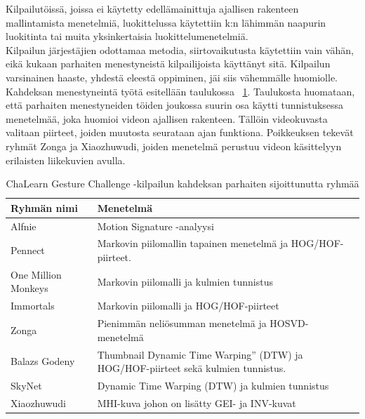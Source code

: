 Kilpailutöissä, joissa ei käytetty edellämainittuja ajallisen rakenteen mallintamista menetelmiä, 
luokittelussa käytettiin k:n lähimmän naapurin luokitinta tai muita yksinkertaisia luokittelumenetelmiä. \\

Kilpailun järjestäjien odottamaa metodia, siirtovaikutusta käytettiin vain vähän, eikä kukaan parhaiten menestyneistä kilpailijoista käyttänyt sitä.
Kilpailun varsinainen haaste, yhdestä eleestä oppiminen, jäi siis vähemmälle huomiolle. \citep {6239178} \\

Kahdeksan menestyneintä työtä esitellään taulukossa ~\ref{table:dvbt_param}. Taulukosta huomataan, että parhaiten menestyneiden töiden
joukossa suurin osa käytti tunnistuksessa menetelmää, joka huomioi videon ajallisen rakenteen. Tällöin videokuvasta valitaan piirteet, joiden
muutosta seurataan ajan funktiona. Poikkeuksen tekevät ryhmät Zonga ja Xiaozhuwudi, joiden menetelmä perustuu videon käsittelyyn erilaisten liikekuvien avulla. 
\citep {6239178}\\

\begin{table}[th]
\caption{ChaLearn Gesture Challenge -kilpailun kahdeksan parhaiten sijoittunutta ryhmää}
\label{table:dvbt_param}
\begin{center}
\begin{tabular}{|p{}|p{}|} 
    \hline
Ryhmän nimi & Menetelmä \\
    \hline
    \hline
Alfnie & Motion Signature -analyysi\\ 
    \hline
Pennect & Markovin piilomallin tapainen menetelmä ja HOG/HOF-piirteet.\\
    \hline
One Million Monkeys & Markovin piilomalli ja kulmien tunnistus\\
    \hline
Immortals & Markovin piilomalli ja HOG/HOF-piirteet\\
    \hline
Zonga & Pienimmän neliösumman menetelmä ja HOSVD-menetelmä\\
    \hline
Balazs Godeny & Thumbnail Dynamic Time Warping” (DTW) ja HOG/HOF-piirteet sekä kulmien tunnistus.\\
    \hline
SkyNet & Dynamic Time Warping (DTW) ja kulmien tunnistus\\
    \hline
Xiaozhuwudi & MHI-kuva johon on lisätty GEI- ja INV-kuvat\\
    \hline	
\end{tabular}
\end{center}
\end{table}

